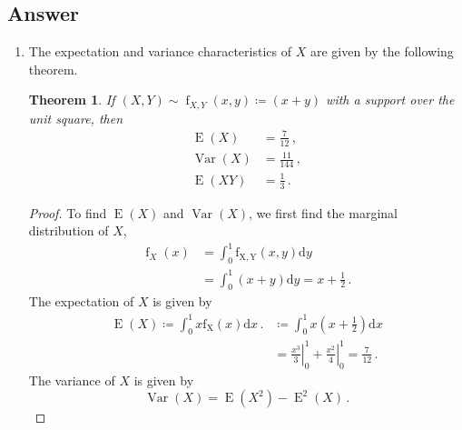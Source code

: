 \documentclass[10pt]{fphw}
\newtheorem{theorem}{Theorem}
\newcommand{\var}{\operatorname{Var}}
\newcommand{\expect}{\operatorname{E}}
\newcommand{\eval}[3]{\left. #1 \right\vert_{#2}^{#3}}
\begin{document}
\subsection*{Answer}
\begin{enumerate} %
	\item The expectation and variance characteristics of $X$ are given by the following theorem.
    \begin{theorem}
   	\label{thm:EX_VX_EXY}	
    If $(X,Y) \sim \operatorname{f}_{X,Y}(x,y) \coloneqq (x+y)$ with a support over the unit square, then
    \begin{align}
        \expect(X)   &= \frac{7}{12}\,,\\
        \var(X)      &= \frac{11}{144}\,,\\
        \expect(X Y) &= \frac{1}{3}\,.
    \end{align}
    \end{theorem}
    \begin{proof}
    To find $\expect(X)$ and $\var(X)$, we first find the marginal distribution of $X$,	
	\begin{equation*}
	\begin{split}
		\operatorname{f}_{X}(x)
			&= \int_{0}^{1} \operatorname{f_{X,Y}}(x,y) \mathrm{d}y\\
			&= \int_{0}^{1} (x+y) \mathrm{d}y = x+\frac{1}{2}\,.
	\end{split}
	\end{equation*}
	The expectation of $X$ is given by
	\begin{equation*}
	\begin{split}
		\expect(X) \coloneqq \int_{0}^{1} x \operatorname{f_X}(x) \mathrm{d}x\,.
			&\coloneqq \int_{0}^{1} x \left(x+\frac{1}{2}\right) \mathrm{d}x\\
			&=\eval{\frac{x^3}{3}}{0}{1} + \eval{\frac{x^2}{4}}{0}{1} = \frac{7}{12}\,.
	\end{split}
	\end{equation*}
	The variance of $X$ is given by
	\begin{equation*}
		\var(X) = \expect(X^2) - \expect^2(X)\,.
	\end{equation*}

\end{proof}
\end{enumerate}
\end{document}
